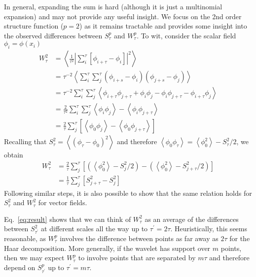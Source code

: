 \documentclass{article}
\begin{document}
In general, expanding the sum is hard (although it is just a multinomial expansion) and may not provide any useful insight.
We focus on the 2nd order structure function ($p=2$) as it remains tractable and provides some insight into the observed differences between $S^p_\tau$ and $W^p_\tau$.
To wit, consider the scalar field $\phi_i = \phi(x_i)$
\begin{align}
    W^2_\tau
        & = \left< \frac{1}{\tau^2} \left| \sum\limits_{i}^{\tau} \left[\phi_{i+\tau} - \phi_{i}\right] \right|^2\right> \nonumber \\
        & = \tau^{-2} \left< \sum\limits_{i}^{\tau} \sum\limits_{j}^{\tau} (\phi_{i+s} - \phi_i)(\phi_{j+s} - \phi_j) \right> \nonumber \\
        & = \tau^{-2} \sum\limits_{i}^{\tau} \sum\limits_{j}^{\tau} \left< \phi_{i+\tau}\phi_{j+\tau} + \phi_{i}\phi_{j} - \phi_{i}\phi_{j+\tau} - \phi_{i+\tau}\phi_{j}\right> \nonumber \\
        & = \frac{2}{\tau^2} \sum\limits_{i}^{\tau} \sum\limits_{j}^{\tau} \left<\phi_i \phi_j\right> - \left<\phi_i \phi_{j+\tau}\right> \nonumber \\
        & = \frac{2}{\tau} \sum\limits_{j}^{\tau} \left[ \left<\phi_0 \phi_j\right> - \left<\phi_0 \phi_{j+\tau}\right> \right]
\end{align}
Recalling that $S^2_\tau = \left<(\phi_\tau - \phi_0)^2\right>$ and therefore $\left<\phi_0 \phi_\tau\right> = \left<\phi_0^2\right> - S^2_\tau/2$,
we obtain
\begin{align}
    W^2_\tau
        & = \frac{2}{\tau}\sum\limits_j^\tau \left[ \left(\left<\phi_0^2\right> - S^2_j/2\right) - \left(\left<\phi_0^2\right> - S^2_{j+\tau}/2\right)\right] \nonumber \\
        & = \frac{1}{\tau} \sum\limits_j^\tau \left[ S^2_{j+\tau} - S^2_j \right] \label{eq:result}
\end{align}
Following similar steps, it is also possible to show that the same relation holds for $S^2_\tau$ and $W^2_\tau$ for vector fields.

Eq.~\ref{eq:result} shows that we can think of $W^2_\tau$ as an average of the differences between $S^2_{\tau^\prime}$ at different scales all the way up to $\tau^\prime = 2\tau$.
Heuristically, this seems reasonable, as $W^p_\tau$ involves the difference between points as far away as $2\tau$ for the Haar decomposition.
More generally, if the wavelet has support over $m$ points, then we may expect $W^p_\tau$ to involve points that are separated by $m\tau$ and therefore depend on $S^p_{\tau^\prime}$ up to $\tau^\prime = m\tau$.
\end{document}
